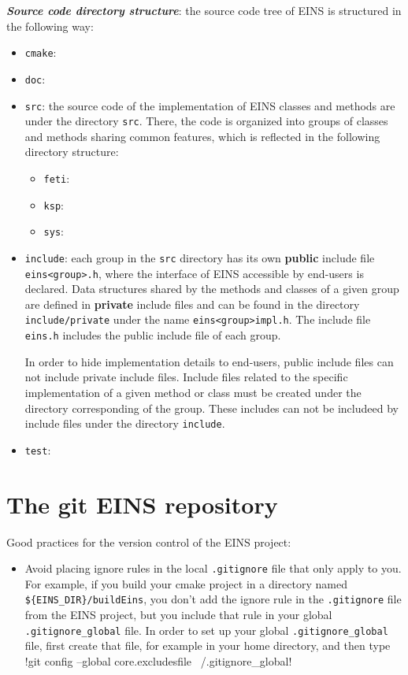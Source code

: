 \documentclass[a4paper,11pt]{report}
\begin{document}
\noindent \textit{\bf Source code directory structure}: the source code tree of
EINS is structured in the following way:
\begin{itemize}[noitemsep,topsep=2pt,parsep=2pt,partopsep=2pt]
\item \verb!cmake!:
\item \verb!doc!:
\item \verb!src!: the source code of the implementation of EINS
  classes and methods are under the directory \verb!src!. There, the
  code is organized into groups of classes and methods sharing common
  features, which is reflected in the following directory structure:
  \begin{itemize}[noitemsep,topsep=2pt,parsep=2pt,partopsep=2pt]
  \item \verb!feti!:
  \item \verb!ksp!:
  \item \verb!sys!:
  \end{itemize}
\item \verb!include!: each group in the \verb!src!  directory has its
  own \textbf{public} include file \verb!eins<group>.h!,
  where the interface of EINS accessible by end-users is
  declared. Data structures shared by the methods and classes of a
  given group are defined in \textbf{private} include files and can be
  found in the directory \verb!include/private! under the name
  \verb!eins<group>impl.h!. The include file \verb!eins.h! includes
  the public include file of each group.  

  In order to hide implementation details to end-users, public include
  files can not include private include files. Include files related
  to the specific implementation of a given method or class must be
  created under the directory corresponding of the group. These
  includes can not be includeed by include files under the directory
  \verb!include!.
 
\item \verb!test!:
\end{itemize}



\section{The git EINS repository}

Good practices for the version control of the EINS project:
\begin{itemize}[noitemsep,topsep=2pt,parsep=2pt,partopsep=2pt]
\item Avoid placing ignore rules in the local \verb!.gitignore! file
  that only apply to you. For example, if you build your cmake
  project in a directory named \verb!${EINS_DIR}/buildEins!, you don't
  add the ignore rule in the \verb!.gitignore! file from the EINS
  project, but you include that rule in your global \verb!.gitignore_global!
  file. In order to set up your global \verb!.gitignore_global! file, first
  create that file, for example in your home directory, and then type
  !git config --global core.excludesfile ~/.gitignore_global!
\end{itemize}
\end{document}
